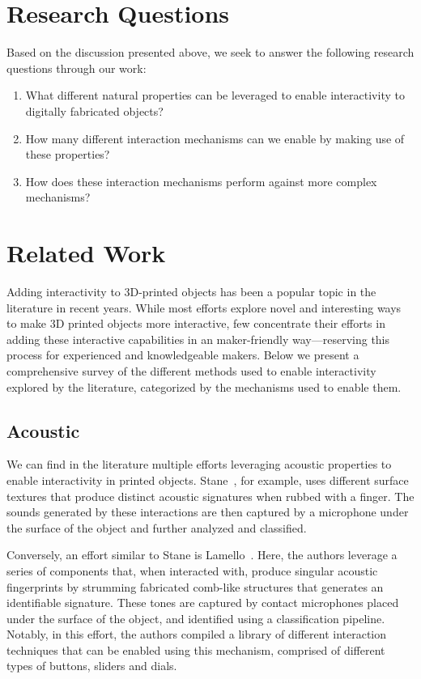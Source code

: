   \section{Research Questions}
    Based on the discussion presented above, we seek to answer the following
    research questions through our work:
    \begin{enumerate}
      \item What different natural properties can be leveraged to enable
        interactivity to digitally fabricated objects?
      \item How many different interaction mechanisms can we enable by making
        use of these properties?
      \item How does these interaction mechanisms perform against more complex
        mechanisms?
    \end{enumerate}
    
  \section{Related Work}
    \label{sec:related-work}
    Adding interactivity to 3D-printed objects has been a popular topic in the
    literature in recent years. While most efforts explore novel and
    interesting ways to make 3D printed objects more interactive, few
    concentrate their efforts in adding these interactive capabilities in an
    maker-friendly way---reserving this process for experienced and
    knowledgeable makers. Below we present a comprehensive survey of the
    different methods used to enable interactivity explored by the
    literature, categorized by the mechanisms used to enable them.

    \subsection{Acoustic}
      We can find in the literature multiple efforts leveraging acoustic
      properties to enable interactivity in printed objects.
      Stane~\cite{MurraySmith:2008ch}, for example, uses different surface
      textures that produce distinct acoustic signatures when rubbed with a
      finger. The sounds generated by these interactions are then captured by a
      microphone under the surface of the object and further analyzed and classified.

      Conversely, an effort similar to Stane is Lamello~\cite{Savage:2015cs}.
      Here, the authors leverage a series of components that, when interacted
      with, produce singular acoustic fingerprints by strumming fabricated
      comb-like structures that generates an identifiable signature. These
      tones are captured by contact microphones placed under the surface of the
      object, and identified using a classification pipeline. Notably, in this
      effort, the authors compiled a library of different interaction
      techniques that can be enabled using this mechanism, comprised of
      different types of buttons, sliders and dials.


